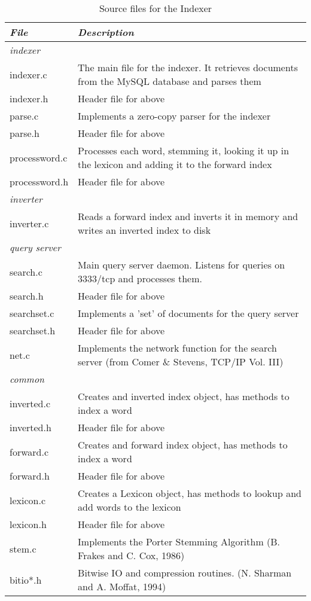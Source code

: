\begin{table}[htbp]
\begin{center}
\begin{tabular}{l|p{9.5cm}}
\emph{File} & \emph{Description} \\
\hline
\emph{indexer} & \\
indexer.c     &  The main file for the indexer.  It retrieves documents from the MySQL database and parses them \\
indexer.h     &  Header file for above \\
parse.c       &  Implements a zero-copy parser for the indexer \\
parse.h       &  Header file for above \\
processword.c &  Processes each word, stemming it, looking it up in the lexicon and adding it to the forward index \\
processword.h &  Header file for above \\
\hline
\emph{inverter} & \\
inverter.c    &  Reads a forward index and inverts it in memory and writes an inverted index to disk\\
\hline
\emph{query server} & \\
search.c      &  Main query server daemon.  Listens for queries on 3333/tcp and processes them.\\
search.h      &  Header file for above \\
searchset.c   &  Implements a 'set' of documents for the query server \\
searchset.h   &  Header file for above \\
net.c         &  Implements the network function for the search server (from Comer \& Stevens, TCP/IP Vol. III)\\
\hline
\emph{common} & \\
inverted.c    &  Creates and inverted index object, has methods to index a word \\
inverted.h    &  Header file for above \\
forward.c     &  Creates and forward index object, has methods to index a word \\
forward.h     &  Header file for above\\
lexicon.c     &  Creates a Lexicon object, has methods to lookup and add words to the lexicon \\
lexicon.h     &  Header file for above\\
stem.c        &  Implements the Porter Stemming Algorithm (B. Frakes and C. Cox, 1986) \\
bitio*.h      &  Bitwise IO and compression routines. (N. Sharman and A. Moffat, 1994) \\

\end{tabular}
\end{center}
\caption{Source files for the Indexer}
\label{tab:indexcode}
\end{table}


